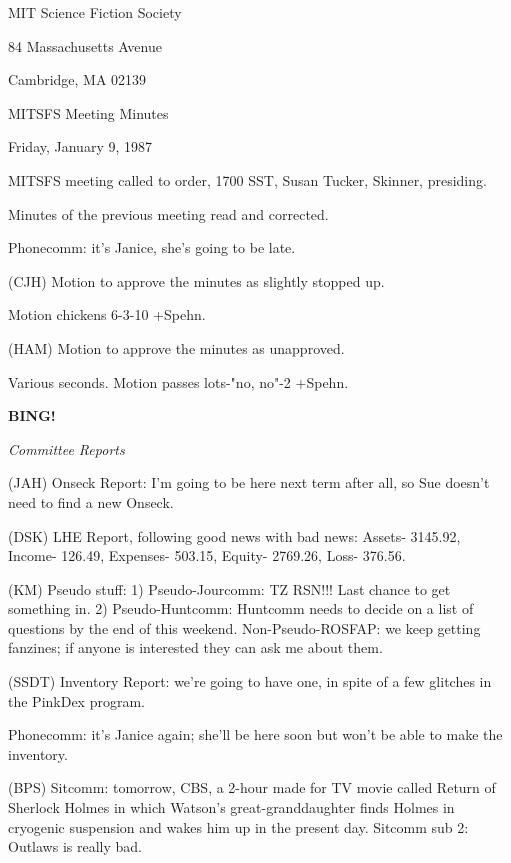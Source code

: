 \documentclass[12pt]{article}
\newcommand{\bing}{{\bf BING!} }
\newcommand{\goto}[1]{\bing \vskip 12pt \centerline{{\em{#1}}}}
\begin{document}
\begin{center}

MIT Science Fiction Society 

84 Massachusetts Avenue

Cambridge, MA 02139

\vspace{12pt}

MITSFS Meeting Minutes 

Friday, January 9, 1987

\end{center}
 
\vspace{18pt}

\setlength{\parskip}{6pt}

\noindent
MITSFS meeting called to order, 1700 SST,
Susan Tucker, Skinner, presiding.

Minutes of the previous meeting read and corrected.

Phonecomm: it's Janice, she's going to be late.

(CJH) Motion to approve the minutes as slightly stopped up.

Motion chickens 6-3-10 +Spehn.

(HAM) Motion to approve the minutes as unapproved.

Various seconds. Motion passes lots-"no, no"-2 +Spehn.

\goto{Committee Reports}

(JAH) Onseck Report: I'm going to be here next term after all, so Sue doesn't need to find a new Onseck.

(DSK) LHE Report, following good news with bad news: Assets- 3145.92, Income- 126.49, Expenses- 503.15, Equity- 2769.26, Loss- 376.56.

(KM) Pseudo stuff: 1) Pseudo-Jourcomm: TZ RSN!!! Last chance to get something in. 2) Pseudo-Huntcomm: Huntcomm needs to decide on a list of questions by the end of this weekend. Non-Pseudo-ROSFAP: we keep getting fanzines; if anyone is interested they can ask me about them.

(SSDT) Inventory Report: we're going to have one, in spite of a few glitches in the PinkDex program.

Phonecomm: it's Janice again; she'll be here soon but won't be able to make the inventory.

(BPS) Sitcomm: tomorrow, CBS, a 2-hour made for TV movie called Return of Sherlock Holmes in which Watson's great-granddaughter finds Holmes in cryogenic suspension and wakes him up in the present day. Sitcomm sub 2: Outlaws is really bad.
\end{document}

